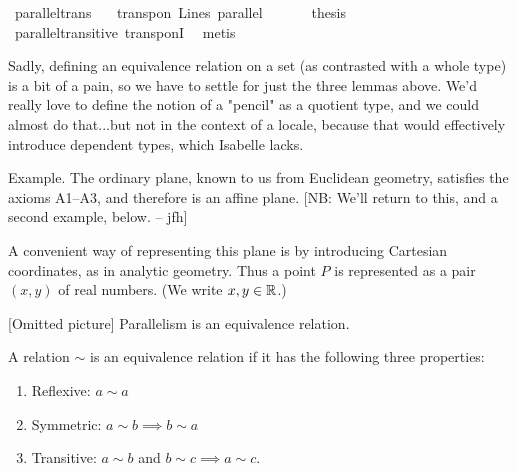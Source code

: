 \begin{isabellebody}
\endisatagproof
{\isafoldproof}%
%
\isadelimproof
%
\endisadelimproof
\isanewline
\isanewline
{}\isamarkupfalse%
\ parallel{\isacharunderscore}{\kern0pt}trans{\isacharcolon}{\kern0pt}\isanewline
\ \ \ {\isachardoublequoteopen}transp{\isacharunderscore}{\kern0pt}on\ Lines\ parallel{\isachardoublequoteclose}\ \isanewline
%
\isadelimproof
%
\endisadelimproof
%
\isatagproof
{}\isamarkupfalse%
\ {\isacharminus}{\kern0pt}\isanewline
\ \ \isamarkupfalse%
\ {\isacharquery}{\kern0pt}thesis\isanewline
\ \ \ \ \isamarkupfalse%
\ parallel{\isacharunderscore}{\kern0pt}transitive\ transp{\isacharunderscore}{\kern0pt}onI\ \isamarkupfalse%
\ metis\isanewline
{}\isamarkupfalse%
%
\endisatagproof
{\isafoldproof}%
%
\isadelimproof
%
\endisadelimproof
%
\begin{isamarkuptext}%
Sadly, defining an equivalence relation on a set
(as contrasted with a whole type) is a bit of a pain, so we have to settle for just the three lemmas above.
We'd really love to define the notion of a "pencil" as a quotient type, and we could
almost do that...but not in the context of a locale, because that would effectively introduce dependent
types, which Isabelle lacks.%
\end{isamarkuptext}\isamarkuptrue%
%
\begin{isamarkuptext}%
\begin{hartshorne}
Example. The ordinary plane, known to us from Euclidean geometry, satisfies the axioms A1–A3, and 
therefore is an affine plane. [NB: We'll return to this, and a second example, below. -- jfh]

A convenient way of representing this plane is by introducing Cartesian coordinates, 
as in analytic geometry. Thus a point $P$ is represented as a pair $(x, y)$ of real numbers. 
(We write $x, y \in \Bbb R$.)

[Omitted picture]
\prop[1.1] Parallelism is an equivalence relation.

\end{hartshorne}%
\end{isamarkuptext}\isamarkuptrue%
%
\begin{isamarkuptext}%
\begin{hartshorne}
 A relation $\sim$ is an equivalence relation if it has the following
three properties:
\begin{enumerate}
\item Reflexive: $a \sim a$
\item Symmetric: $a \sim b \implies b \sim a$
\item Transitive: $a \sim b$ and $b \sim c \implies a \sim c$.
\end{enumerate}


\end{hartshorne}
\end{isamarkuptext}
\end{isabellebody}
